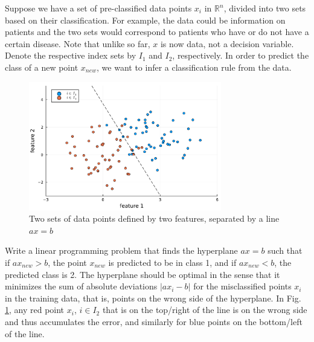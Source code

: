 Suppose we have a set of pre-classified data points $x_i$ in $\mathbb{R}^n$, divided into two sets based on their classification. For example, the data could be information on patients and the two sets would correspond to patients who have or do not have a certain disease. Note that unlike so far, $x$ is now data, not a decision variable. Denote the respective index sets by $I_1$ and $I_2$, respectively. In order to predict the class of a new point $x_{new}$, we want to infer a classification rule from the data.
\begin{figure}
    \includegraphics[width=0.75\textwidth]{chapters/chapter_1/figures/figure_e16.pdf}
    \caption{Two sets of data points defined by two features, separated by a line $ax=b$} 
    \label{p1c1:fig:fig_e16}		
\end{figure}

Write a linear programming problem that finds the hyperplane $ax = b$ such that if $ax_{new} > b$, the point $x_{new}$ is predicted to be in class 1, and if $ax_{new}<b$, the predicted class is 2. The hyperplane should be optimal in the sense that it minimizes the sum of absolute deviations $|ax_i-b|$ for the misclassified points $x_i$ in the training data, that is, points on the wrong side of the hyperplane. In Fig. \ref{p1c1:fig:fig_e16}, any red point $x_i$, $i \in I_2$ that is on the top/right of the line is on the wrong side and thus accumulates the error, and similarly for blue points on the bottom/left of the line.
